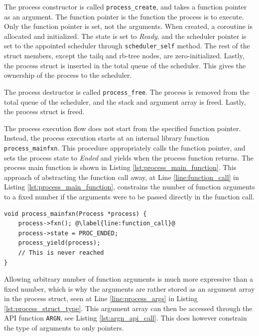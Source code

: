 The process constructor is called \texttt{process\_create}, and takes a function pointer as an argument. The function pointer is the function the process is to execute. Only the function pointer is set, not the arguments. When created, a coroutine is allocated and initialized. The state is set to \textit{Ready}, and the scheduler pointer is set to the appointed scheduler through \texttt{scheduler\_self} method. The rest of the struct members, except the tailq and rb\hyp{}tree nodes, are zero\hyp{}initialized. Lastly, the process struct is inserted in the total queue of the scheduler. This gives the ownership of the process to the scheduler. 

The process destructor is called \texttt{process\_free}. The process is removed from the total queue of the scheduler, and the stack and argument array is freed. Lastly, the process struct is freed.

The process execution flow does not start from the specified function pointer. Instead, the process execution starts at an internal library function \texttt{process\_mainfxn}. This procedure appropriately calls the function pointer, and sets the process state to \textit{Ended} and yields when the process function returns. The process main function is shown in Listing \ref{lst:process_main_function}. This approach of abstracting the function call away, at Line \ref{line:function_call} in Listing \ref{lst:process_main_function}, constrains the number of function arguments to a fixed number if the arguments were to be passed directly in the function call.

\noindent\begin{minipage}{\textwidth}
\begin{lstlisting}[style={CustomC},caption={Process main function},label={lst:process_main_function}]
void process_mainfxn(Process *process) {
    process->fxn(); @\label{line:function_call}@
    process->state = PROC_ENDED;
    process_yield(process);
    // This is never reached
}
\end{lstlisting}
\end{minipage}

Allowing arbitrary number of function arguments is much more expressive than a fixed number, which is why the arguments are rather stored as an argument array in the process struct, seen at Line \ref{line:process_args} in Listing \ref{lst:process_struct_type}. This argument array can then be accessed through the API function \texttt{ARGN}, see Listing \ref{lst:argn_api_call}. This does however constrain the type of arguments to only pointers. 

